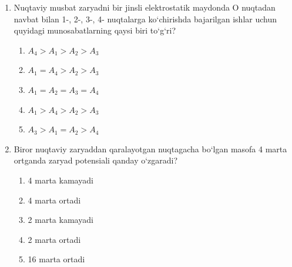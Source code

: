 \begin{enumerate}
    \item Nuqtaviy musbat zaryadni bir jinsli elektrostatik maydonda O nuqtadan navbat bilan 1-, 2-, 3-, 4- nuqtalarga ko‘chirishda bajarilgan ishlar uchun quyidagi munosabatlarning qaysi biri to‘g‘ri?


    \begin{enumerate}[label=\Alph*)]
        \item $A_4>A_1>A_2>A_3$
        \item $A_1=A_4>A_2>A_3$
        \item $A_1=A_2=A_3=A_4$
        \item $A_1>A_4>A_2>A_3$
        \item $A_3>A_1=A_2>A_4$
    \end{enumerate}

    \item Biror nuqtaviy zaryaddan qaralayotgan nuqtagacha bo‘lgan masofa 4 marta ortganda zaryad potensiali qanday o‘zgaradi?
    \begin{enumerate}[label=\Alph*)]
        \item 4 marta kamayadi
        \item 4 marta ortadi
        \item 2 marta kamayadi
        \item 2 marta ortadi
        \item 16 marta ortadi
    \end{enumerate}


\end{enumerate}
